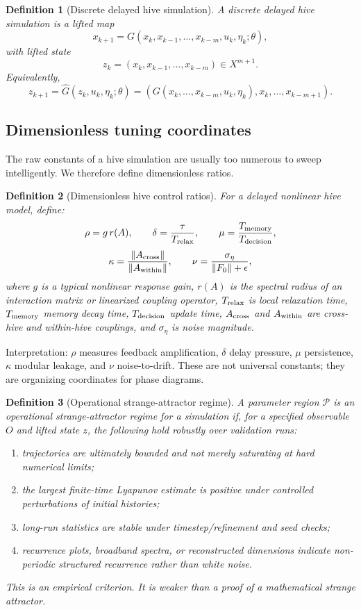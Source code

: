 \documentclass[11pt]{article}
\newtheorem{definition}{Definition}
\begin{document}
\begin{definition}[Discrete delayed hive simulation]
A discrete delayed hive simulation is a lifted map
\[
  x_{k+1}=G(x_k,x_{k-1},\ldots,x_{k-m},u_k,\eta_k;\theta),
\]
with lifted state
\[
  z_k=(x_k,x_{k-1},\ldots,x_{k-m})\in X^{m+1}.
\]
Equivalently,
\[
  z_{k+1}=\widehat G(z_k,u_k,\eta_k;\theta)
  =(G(x_k,\ldots,x_{k-m},u_k,\eta_k),x_k,\ldots,x_{k-m+1}).
\]
\end{definition}

\subsection{Dimensionless tuning coordinates}

The raw constants of a hive simulation are usually too numerous to sweep
intelligently.  We therefore define dimensionless ratios.

\begin{definition}[Dimensionless hive control ratios]
For a delayed nonlinear hive model, define:
\[
  \rho = g\,r(A),
  \qquad
  \delta = \frac{\tau}{T_{\rm relax}},
  \qquad
  \mu = \frac{T_{\rm memory}}{T_{\rm decision}},
\]
\[
  \kappa = \frac{\|A_{\rm cross}\|}{\|A_{\rm within}\|},
  \qquad
  \nu = \frac{\sigma_\eta}{\|F_0\|+\epsilon},
\]
where $g$ is a typical nonlinear response gain, $r(A)$ is the spectral radius of
an interaction matrix or linearized coupling operator, $T_{\rm relax}$ is local
relaxation time, $T_{\rm memory}$ memory decay time, $T_{\rm decision}$ update
time, $A_{\rm cross}$ and $A_{\rm within}$ are cross-hive and within-hive
couplings, and $\sigma_\eta$ is noise magnitude.
\end{definition}

Interpretation: $\rho$ measures feedback amplification, $\delta$ delay pressure,
$\mu$ persistence, $\kappa$ modular leakage, and $\nu$ noise-to-drift.  These are
not universal constants; they are organizing coordinates for phase diagrams.

\begin{definition}[Operational strange-attractor regime]
A parameter region $\mathcal P$ is an operational strange-attractor regime for a
simulation if, for a specified observable $O$ and lifted state $z$, the following
hold robustly over validation runs:
\begin{enumerate}
  \item trajectories are ultimately bounded and not merely saturating at hard
        numerical limits;
  \item the largest finite-time Lyapunov estimate is positive under controlled
        perturbations of initial histories;
  \item long-run statistics are stable under timestep/refinement and seed checks;
  \item recurrence plots, broadband spectra, or reconstructed dimensions indicate
        non-periodic structured recurrence rather than white noise.
\end{enumerate}
This is an empirical criterion.  It is weaker than a proof of a mathematical
strange attractor.
\end{definition}
\end{document}
